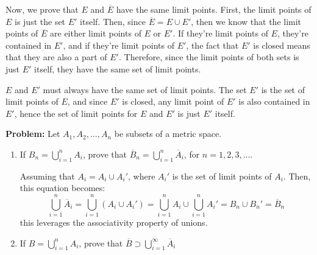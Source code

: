 \documentclass[10pt]{article}
\newenvironment{problem}{\textbf{Problem:}}{}
\begin{document}
\begin{solution}
		Now, we prove that \( E \) and \( \overline E \) have the same limit points. First, the limit 
		points of \( E \) is just the set \( E' \) itself. 
		Then, since \( \overline E = E \cup E' \), then we know that the limit points of \( \overline E \) 
		are either limit points of \( E \) or \( E' \). If they're limit points of \( E \), they're contained
		in \( E' \), and if they're limit points of \( E' \), the fact that \( E' \) is closed means that they 
		are also a part of \( E' \). Therefore, since the limit points of both sets is just \( E' \) itself, 
		they have the same set of limit points. 

		\( E \) and \( E' \) must always have the same set of limit points. The set \( E' \) is the set of 
		limit points of \( E \), and since \( E' \) is closed, any limit point of \( E' \) is also contained in 
		\( E' \), hence the set of limit points for \( E \) and \( E' \) is just \( E' \) itself.  
	\end{solution}

	\begin{problem}
		Let \( A_1, A_2, \dots, A_n \) be subsets of a metric space. 
		\begin{enumerate}[label=\alph*)]
			\item If \( B_n = \bigcup_{i = 1}^{n}A_i \), prove that \( \overline B_n = 
				\bigcup_{i = 1}^{n}\overline A_i \), for \( n = 1, 2, 3, \dots \). 

				\begin{solution}
					Assuming that \( A_i = A_i \cup A_i' \), where \( A_i'\) is the set of limit 
					points of \( A_i \). Then, this equation becomes:
					\[
					\bigcup_{i = 1}^{n}\overline A_i = \bigcup_{i = 1} ^{n}(A_i \cup A_i')
					= \bigcup_{i=1} ^{n}A_i \cup \bigcup_{i = 1} ^{n}A_i' = B_n \cup B_n' = \overline B_n 
					\] 
					this leverages the associativity property of unions.  
				\end{solution}
			\item If \( B = \bigcup_{i = 1}^{n}A_i \), prove that \( \overline B \supset 
				\bigcup_{i = 1}^{\infty}\overline A_i \)
		\end{enumerate}
	\end{problem}
\end{document}
